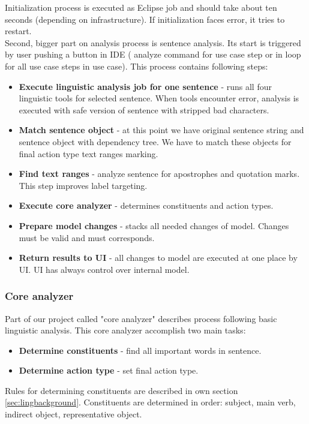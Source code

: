 Initialization process is executed as Eclipse job and should take about ten seconds (depending on infrastructure). If initialization faces error, it tries to restart.\\

Second, bigger part on analysis process is sentence analysis. Its start is triggered by user pushing a button in IDE ( analyze command for use case step or in loop for all use case steps in use case). This process contains following steps:

\begin{itemize}
\item {\bf Execute linguistic analysis job for one sentence} - runs all four linguistic tools for selected sentence. When tools encounter error, analysis is executed with safe version of sentence with stripped bad characters. 
\item {\bf Match sentence object} - at this point we have original sentence string and sentence object with dependency tree. We have to match these objects for final action type text ranges marking.
\item {\bf Find text ranges} - analyze sentence for apostrophes and quotation marks. This step improves label targeting.
\item {\bf Execute core analyzer} - determines constituents and action types.
\item {\bf Prepare model changes} - stacks all needed changes of model. Changes must be valid and must corresponds.
\item {\bf Return results to UI} - all changes to model are executed at one place by UI. UI has always control over internal model.
\end{itemize}

\subsubsection{Core analyzer}
Part of our project called "core analyzer" describes process following basic linguistic analysis. This core analyzer accomplish two main tasks:

\begin{itemize}
\item {\bf Determine constituents} - find all important words in sentence.
\item {\bf Determine action type} - set final action type.
\end{itemize}

Rules for determining constituents are described in own section \ref{sec:lingbackground}. Constituents are determined in order: subject, main verb, indirect object, representative object.

